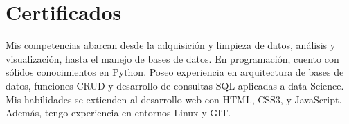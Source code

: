 \documentclass[a4paper,10pt]{article}
\begin{document}
	\section*{Certificados}
				\small      
			Mis competencias abarcan desde la adquisición y limpieza de datos, análisis y visualización, hasta el manejo de bases de datos.  En programación, cuento con sólidos conocimientos en Python. Poseo experiencia en arquitectura de bases de datos, funciones CRUD y desarrollo de consultas SQL aplicadas a data Science. Mis habilidades se extienden al desarrollo web con HTML, CSS3, y JavaScript. Además, tengo experiencia en entornos Linux y GIT. 
\end{document}
